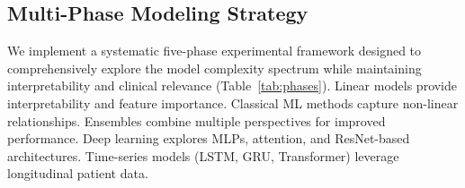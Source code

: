 \documentclass[conference]{IEEEtran}
\begin{document}
\subsection{Multi-Phase Modeling Strategy}
We implement a systematic five-phase experimental framework designed to comprehensively explore the model complexity spectrum while maintaining interpretability and clinical relevance (Table~\ref{tab:phases}). Linear models provide interpretability and feature importance. Classical ML methods capture non-linear relationships. Ensembles combine multiple perspectives for improved performance. Deep learning explores MLPs, attention, and ResNet-based architectures. Time-series models (LSTM, GRU, Transformer) leverage longitudinal patient data.

\begin{table}[h]
\centering
\caption{Multi-Phase Modeling Framework}
\label{tab:phases}
\end{table}
\end{document}
